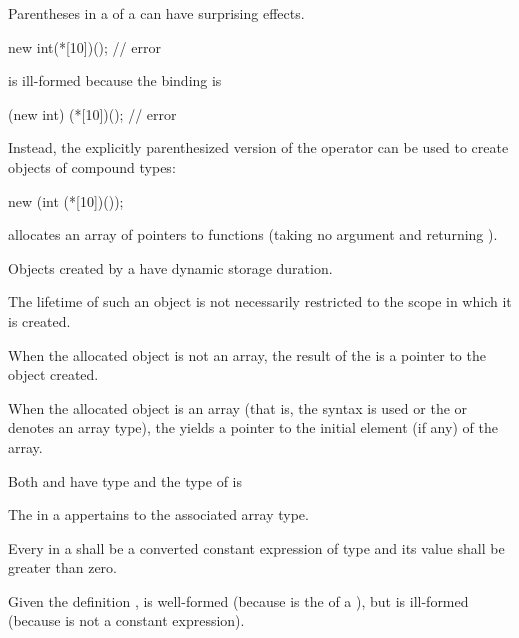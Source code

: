 \pnum
\begin{note}
%
Parentheses in a  of a 
can have surprising effects.
\begin{example}
\begin{codeblock}
new int(*[10])();               // error
\end{codeblock}
is ill-formed because the binding is
\begin{codeblock}
(new int) (*[10])();            // error
\end{codeblock}

Instead, the explicitly parenthesized version of the 
operator can be used to create objects of compound
types:

\begin{codeblock}
new (int (*[10])());
\end{codeblock}
allocates an array of  pointers to functions (taking no
argument and returning ).
\end{example}
\end{note}

\pnum
{}%
Objects created by a  have dynamic storage
duration.
\begin{note}
%
The lifetime of such an object is not necessarily restricted to the
scope in which it is created.
\end{note}
When the allocated object is not an array, the result of the 
is a pointer to the object created.

\pnum
{}%
When the allocated object is an array (that is, the
 syntax is used or the
 or  denotes an array type), the
 yields a pointer to the initial element (if
any) of the array.
\begin{note}
Both  and  have type  and
the type of  is 
\end{note}
The  in a  appertains
to the associated array type.

\pnum
Every  in a
 shall be a converted constant
expression of type  and
its value shall be greater than zero.
\begin{example}
Given the definition ,
 is well-formed (because  is the
 of a ), but
 is ill-formed (because  is not a
constant expression).
\end{example}

